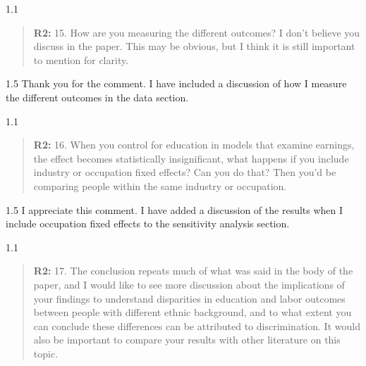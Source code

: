 \documentclass[12pt,english]{article}
\newcommand{\rrquote}{1.1}
\newcommand{\rrxspc}{1.5}
\begin{document}
\begin{refsection}
    \begin{spacing}{\rrquote}
        \begin{quotation}
        \textbf{R2: } 15. How are you measuring the different outcomes? I don’t believe you discuss in the paper. This may be obvious, but I think it is still important to mention for clarity.
              
        \end{quotation}
        \end{spacing}
    
        \begin{spacing}{\rrxspc}
            Thank you for the comment. I have included a discussion of how I measure the different outcomes in the data section.        
    \end{spacing}

    \begin{spacing}{\rrquote}
        \begin{quotation}
        \textbf{R2: } 16. When you control for education in models that examine earnings, the effect becomes statistically insignificant, what happens if you include industry or occupation fixed effects? Can you do that? Then you'd be comparing people within the same industry or occupation.
              
        \end{quotation}
        \end{spacing}
            
        \begin{spacing}{\rrxspc}
            I appreciate this comment. I have added a discussion of the results when I include occupation fixed effects to the sensitivity analysis section.
    \end{spacing}

    \begin{spacing}{\rrquote}
        \begin{quotation}
        \textbf{R2: } 17. The conclusion repeats much of what was said in the body of the paper, and I would like to see more discussion about the implications of your findings to understand disparities in education and labor outcomes between people with different ethnic background, and to what extent you can conclude these differences can be attributed to discrimination. It would also be important to compare your results with other literature on this topic.
              
        \end{quotation}
        \end{spacing}
        

\end{refsection}
\end{document}
